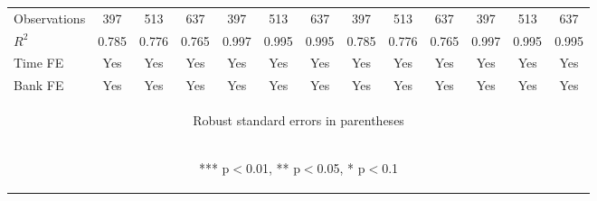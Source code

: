 \documentclass[]{article}
\begin{document}
\begin{center}
\begin{tabular}{lcccccccccccc}
Observations & 397 & 513 & 637 & 397 & 513 & 637 & 397 & 513 & 637 & 397 & 513 & 637 \\
$R^2$ & 0.785 & 0.776 & 0.765 & 0.997 & 0.995 & 0.995 & 0.785 & 0.776 & 0.765 & 0.997 & 0.995 & 0.995 \\
Time FE & Yes & Yes & Yes & Yes & Yes & Yes & Yes & Yes & Yes & Yes & Yes & Yes \\
 Bank FE & Yes & Yes & Yes & Yes & Yes & Yes & Yes & Yes & Yes & Yes & Yes & Yes \\ \hline
\multicolumn{13}{c}{\begin{footnotesize} Robust standard errors in parentheses\end{footnotesize}} \\
\multicolumn{13}{c}{\begin{footnotesize} *** p$<$0.01, ** p$<$0.05, * p$<$0.1\end{footnotesize}} \\
\end{tabular}
\end{center}
\end{document}
